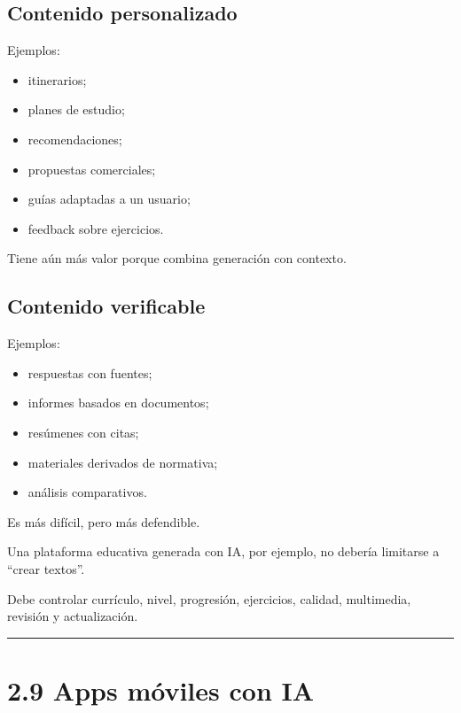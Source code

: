 \subsection{Contenido personalizado}\label{contenido-personalizado}

Ejemplos:

\begin{itemize}
\tightlist
\item
  itinerarios;
\item
  planes de estudio;
\item
  recomendaciones;
\item
  propuestas comerciales;
\item
  guías adaptadas a un usuario;
\item
  feedback sobre ejercicios.
\end{itemize}

Tiene aún más valor porque combina generación con contexto.

\subsection{Contenido verificable}\label{contenido-verificable}

Ejemplos:

\begin{itemize}
\tightlist
\item
  respuestas con fuentes;
\item
  informes basados en documentos;
\item
  resúmenes con citas;
\item
  materiales derivados de normativa;
\item
  análisis comparativos.
\end{itemize}

Es más difícil, pero más defendible.

Una plataforma educativa generada con IA, por ejemplo, no debería
limitarse a ``crear textos''.

Debe controlar currículo, nivel, progresión, ejercicios, calidad,
multimedia, revisión y actualización.

\begin{center}\rule{0.5\linewidth}{0.5pt}\end{center}

\section{2.9 Apps móviles con IA}\label{apps-muxf3viles-con-ia}

